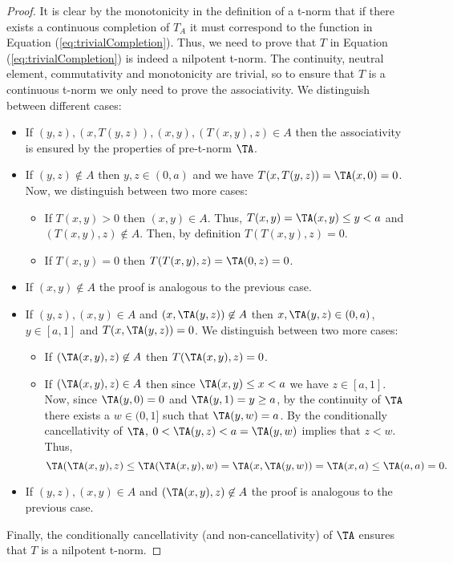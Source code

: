 \begin{proof}
	It is clear by the monotonicity in the definition of a t-norm that if there exists a continuous completion of $T_A$ it must correspond to the function in Equation (\ref{eq:trivialCompletion}). Thus, we need to prove that $T$ in Equation (\ref{eq:trivialCompletion}) is indeed a nilpotent t-norm. The continuity, neutral element, commutativity and monotonicity are trivial, so to ensure that $T$ is a continuous t-norm we only need to prove the associativity. We distinguish between different cases:
	\begin{itemize}
		\item If $(y,z), (x,T(y,z)), (x,y), (T(x,y),z) \in A$ then the associativity is ensured by the properties of pre-t-norm $\TA$.
		\item If $(y,z) \not \in A$ then $y,z \in (0,a)$ and we have $T(x,T(y,z)) = \TA(x,0) = 0$. Now, we distinguish between two more cases:
		\begin{itemize}
			\item If $T(x,y)>0$ then $(x,y) \in A$. Thus, $T(x,y)=\TA(x,y) \leq y <a$ and $(T(x,y),z) \not \in A$. Then, by definition $T(T(x,y),z)=0$.
			\item If $T(x,y)=0$ then $T(T(x,y),z)=\TA(0,z)=0$.
		\end{itemize}
		\item If $(x,y) \not \in A$ the proof is analogous to the previous case.
		\item If  $(y,z),(x,y) \in A$ and $(x,\TA(y,z)) \not \in A$ then $x,\TA(y,z) \in (0,a)$, $y \in [a,1]$ and $T(x,\TA(y,z))=0$. We distinguish between two more cases:
		\begin{itemize}
			\item If $(\TA(x,y),z) \not \in A$ then $T(\TA(x,y),z)=0$.
			\item If $(\TA(x,y),z) \in A$ then since $\TA(x,y) \leq x < a$ we have $z \in [a,1]$. Now,  since $\TA(y,0)=0$ and $\TA(y,1)=y \geq a$, by the continuity of $\TA$ there exists a $w \in (0,1]$ such that $\TA(y,w)=a$. By the conditionally cancellativity of $\TA$, $0<\TA(y,z)<a=\TA(y,w)$ implies that $z<w$. Thus,
			$$\TA(\TA(x,y),z) \leq \TA(\TA(x,y),w)=\TA(x,\TA(y,w)) = \TA(x,a) \leq \TA(a,a)=0.$$
		\end{itemize}
		\item If  $(y,z),(x,y) \in A$ and $(\TA(x,y),z) \not \in A$ the proof is analogous to the previous case.
	\end{itemize}
	Finally, the conditionally cancellativity (and non-cancellativity) of $\TA$ ensures that $T$ is a nilpotent t-norm.
\end{proof}

